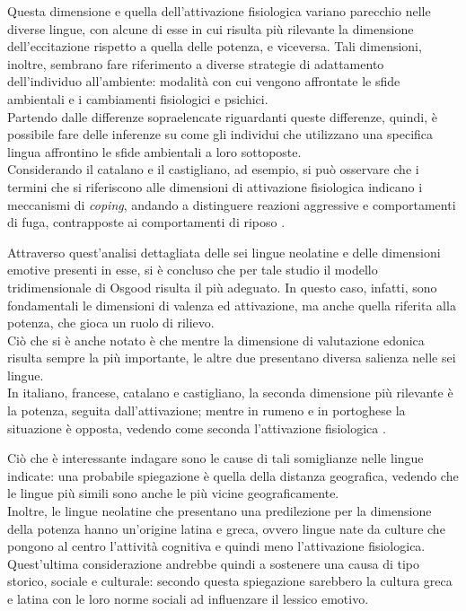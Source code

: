 Questa dimensione e quella dell'attivazione fisiologica variano parecchio nelle diverse lingue, con alcune di esse in cui risulta più rilevante la dimensione dell'eccitazione rispetto a quella delle potenza, e viceversa. Tali dimensioni, inoltre, sembrano fare riferimento a diverse strategie di adattamento dell'individuo all'ambiente: modalità con cui vengono affrontate le sfide ambientali e i cambiamenti fisiologici e psichici. \\
Partendo dalle differenze sopraelencate riguardanti queste differenze, quindi, è possibile fare delle inferenze su come gli individui che utilizzano una specifica lingua affrontino le sfide ambientali a loro sottoposte. \\
Considerando il catalano e il castigliano, ad esempio, si può osservare che i termini che si riferiscono alle dimensioni di attivazione fisiologica indicano i meccanismi di \textit{coping}, andando a distinguere reazioni aggressive e comportamenti di fuga, contrapposte ai comportamenti di riposo \parencite{Sini}. 

Attraverso quest'analisi dettagliata delle sei lingue neolatine e delle dimensioni emotive presenti in esse, si è concluso che per tale studio il modello tridimensionale di Osgood risulta il più adeguato. In questo caso, infatti, sono fondamentali le dimensioni di valenza ed attivazione, ma anche quella riferita alla potenza, che gioca un ruolo di rilievo. \\
Ciò che si è anche notato è che mentre la dimensione di valutazione edonica risulta sempre la più importante, le altre due presentano diversa salienza nelle sei lingue. \\
In italiano, francese, catalano e castigliano, la seconda dimensione più rilevante è la potenza, seguita dall'attivazione; mentre in rumeno e in portoghese la situazione è opposta, vedendo come seconda l'attivazione fisiologica \parencite{Sini}. 

Ciò che è interessante indagare sono le cause di tali somiglianze nelle lingue indicate: una probabile spiegazione è quella della distanza geografica, vedendo che le lingue più simili sono anche le più vicine geograficamente. \\
Inoltre, le lingue neolatine che presentano una predilezione per la dimensione della potenza hanno un'origine latina e greca, ovvero lingue nate da culture che pongono al centro l'attività cognitiva e quindi meno l'attivazione fisiologica. Quest'ultima considerazione andrebbe quindi a sostenere una causa di tipo storico, sociale e culturale: secondo questa spiegazione sarebbero la cultura greca e latina con le loro norme sociali ad influenzare il lessico emotivo. 

